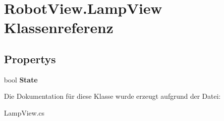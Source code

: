 \hypertarget{class_robot_view_1_1_lamp_view}{
\section{RobotView.LampView Klassenreferenz}
\label{class_robot_view_1_1_lamp_view}
}
\subsection*{Propertys}
\begin{DoxyCompactItemize}
\item 
\hypertarget{class_robot_view_1_1_lamp_view_a30573da6542638c876da84f80bdcaeac}{
bool {\bfseries State}}
\label{class_robot_view_1_1_lamp_view_a30573da6542638c876da84f80bdcaeac}

\end{DoxyCompactItemize}


Die Dokumentation für diese Klasse wurde erzeugt aufgrund der Datei:\begin{DoxyCompactItemize}
\item 
LampView.cs\end{DoxyCompactItemize}

